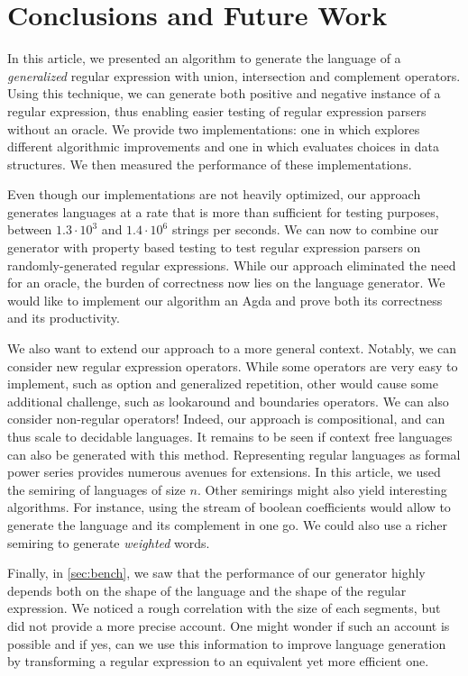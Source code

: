 \section{Conclusions and Future Work}
\label{sec:conclusions}

In this article, we presented an algorithm to generate the language
of a \emph{generalized} regular expression with union, intersection
and complement operators. Using this technique, we can generate both
positive and negative instance of a regular expression, thus enabling
easier testing of regular expression parsers without an oracle.
We provide two implementations: one in \haskell which explores
different algorithmic improvements and one in \ocaml which evaluates choices
in data structures. We then measured the performance of these implementations.

Even though our implementations are not heavily optimized, our approach generates
languages at a rate that is more than sufficient for testing
purposes, between $1.3\cdot10^3$ and $1.4\cdot10^6$ strings per seconds.
We can now to combine our generator with property based testing
to test regular expression parsers on randomly-generated regular expressions.
While our approach eliminated the need for an oracle, the burden of correctness
now lies on the language generator. We would like to implement our algorithm
an Agda and prove both its correctness and its productivity.

We also want to extend our approach to a more general context.
Notably, we can consider new regular expression operators.
While some operators are very easy to implement, such as option and generalized repetition,
other would cause some additional challenge, such as lookaround and boundaries
operators. We can also consider non-regular operators! Indeed, our approach
is compositional, and can thus scale to decidable languages.
It remains to be seen if context free languages can also be generated
with this method.
Representing regular languages as formal power series provides numerous avenues
for extensions. In this article, we used the semiring
of languages of size $n$. Other semirings might also yield interesting
algorithms. For instance, using the stream of boolean coefficients would
allow to generate the language and its complement in one go. We could
also use a richer semiring to generate \emph{weighted} words.

Finally, in \cref{sec:bench}, we saw that the performance of our
generator highly depends
both on the shape of the language and the shape of the regular expression.
We noticed a rough correlation with the size of each segments, but did not
provide a more precise account. One might wonder if such an account is possible
and if yes, can we use this information to improve language generation
by transforming a regular expression to an equivalent yet more efficient one.

